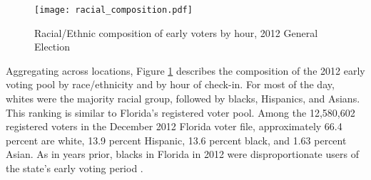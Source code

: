\documentclass[12pt,titlepage]{article}
\begin{document}



\begin{figure}[!ht]
\caption{Racial/Ethnic composition of early voters by hour, 2012 General Election}
  \label{fig:race2012}
  \centering
    \centering\texttt{[image: racial\_composition.pdf]}
\end{figure}

Aggregating across locations, Figure \ref{fig:race2012} describes the
composition of the 2012 early voting pool by race/ethnicity and by
hour of check-in.  For most of the day, whites were the majority
racial group, followed by blacks, Hispanics, and Asians.  This ranking
is similar to Florida's registered voter pool.  Among the 12,580,602
registered voters in the December 2012 Florida voter file,
approximately 66.4 percent are white, 13.9 percent Hispanic, 13.6
percent black, and 1.63 percent Asian.  As in years prior, blacks in
Florida in 2012 were disproportionate users of the state's early
voting period \citep{herronsmith:souls}.




\end{document}
